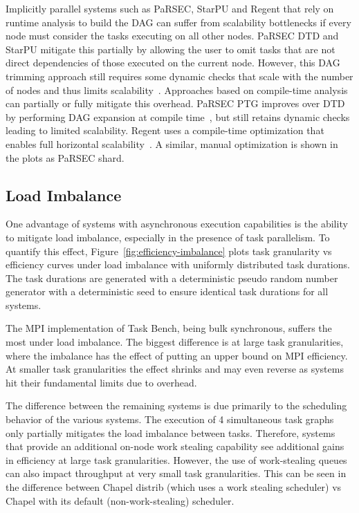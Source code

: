 Implicitly parallel systems such as PaRSEC, StarPU and Regent that
rely on runtime analysis to build the DAG can suffer from
scalability bottlenecks if every node must consider the tasks
executing on all other nodes. PaRSEC DTD and StarPU mitigate this
partially by allowing the user to omit tasks that are not direct
dependencies of those executed on the current node. However, this DAG
trimming approach still requires some dynamic checks that scale with
the number of nodes and thus limits scalability~\cite{PARSEC_DTD}. Approaches based on compile-time analysis can
partially or fully mitigate this overhead. PaRSEC PTG improves over DTD 
by performing DAG expansion at compile time~\cite{PARSEC_DTD}, but
still retains dynamic checks leading to limited scalability. Regent
uses a compile-time optimization that enables full horizontal
scalability~\cite{ControlReplication17}. A similar, manual
optimization is shown in the plots as PaRSEC shard.



\subsection{Load Imbalance}



One advantage of systems with asynchronous execution capabilities is
the ability to mitigate load imbalance, especially in the presence of
task parallelism. To quantify this effect,
Figure~\ref{fig:efficiency-imbalance} plots task granularity vs
efficiency curves under load imbalance with uniformly distributed task
durations. The task durations are generated with a deterministic
pseudo random number generator with a deterministic seed to ensure
identical task durations for all systems.

The MPI implementation of Task Bench, being bulk synchronous,
suffers the most under load imbalance. The biggest
difference is at large task granularities, where the imbalance has the
effect of putting an upper bound on MPI efficiency. At smaller task
granularities the effect shrinks and may even reverse as systems hit
their fundamental limits due to overhead.

The difference between the remaining systems is due primarily to the
scheduling behavior of the various systems. The execution of 4
simultaneous task graphs only partially mitigates the
load imbalance between tasks. Therefore, systems that provide an
additional on-node work stealing capability see additional gains in
efficiency at large task granularities. However, the use of
work-stealing queues can also impact throughput at very small task
granularities. This can be seen in the difference between Chapel
distrib (which uses a work stealing scheduler) vs Chapel with its
default (non-work-stealing) scheduler.

